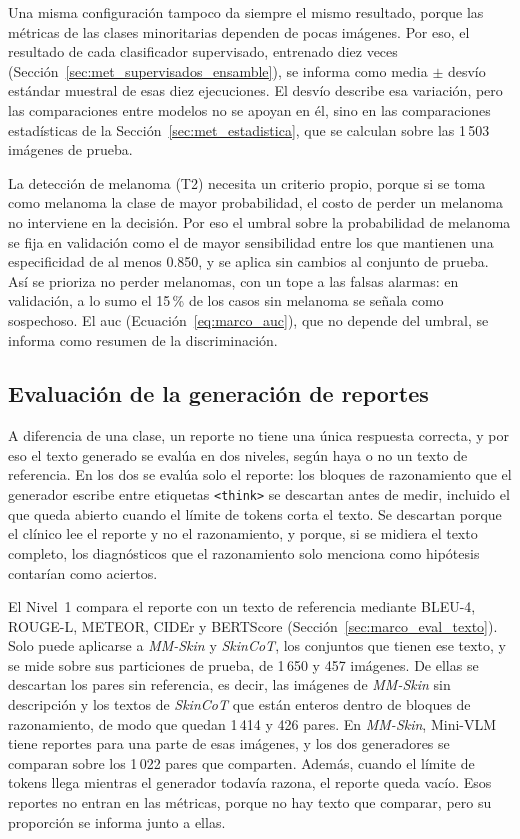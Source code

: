 Una misma configuración tampoco da siempre el mismo resultado, porque las métricas de las clases minoritarias dependen
de pocas imágenes. Por eso, el resultado de cada clasificador supervisado, entrenado diez veces
(Sección~\ref{sec:met_supervisados_ensamble}), se informa como media $\pm$ desvío estándar muestral de esas diez ejecuciones. El desvío describe esa variación, pero las comparaciones entre
modelos no se apoyan en él, sino en las comparaciones estadísticas de la Sección~\ref{sec:met_estadistica}, que se calculan
sobre las 1\,503 imágenes de prueba.

La detección de melanoma (T2) necesita un criterio propio, porque si se toma como melanoma la clase de mayor
probabilidad, el costo de perder un melanoma no interviene en la decisión. Por eso el umbral sobre la probabilidad de
melanoma se fija en validación como el de mayor sensibilidad entre los que mantienen una especificidad de al menos
0.850, y se aplica sin cambios al conjunto de prueba. Así se prioriza no perder melanomas, con un tope a las falsas alarmas: en
validación, a lo sumo el 15\,\% de los casos sin melanoma se señala como sospechoso. El \gls{auc}
(Ecuación~\ref{eq:marco_auc}), que no depende del umbral, se informa como resumen de la discriminación.

\subsection{Evaluación de la generación de reportes}
\label{sec:met_eval_generacion}

A diferencia de una clase, un reporte no tiene una única respuesta correcta, y por eso el texto generado se evalúa en
dos niveles, según haya o no un texto de referencia. En los dos se evalúa solo el reporte: los bloques de razonamiento
que el generador escribe entre etiquetas \texttt{\textless{}think\textgreater{}} se descartan antes de medir, incluido
el que queda abierto cuando el límite de tokens corta el texto. Se descartan porque el clínico lee el reporte y no el
razonamiento, y porque, si se midiera el texto completo, los diagnósticos que el razonamiento solo menciona como
hipótesis contarían como aciertos.

El Nivel~1 compara el reporte con un texto de referencia mediante BLEU-4, ROUGE-L, METEOR, CIDEr y BERTScore
(Sección~\ref{sec:marco_eval_texto}). Solo puede aplicarse a \emph{MM-Skin} y \emph{SkinCoT}, los conjuntos que tienen
ese texto, y se mide sobre sus particiones de prueba, de 1\,650 y 457 imágenes. De ellas se descartan los pares sin
referencia, es decir, las imágenes de \emph{MM-Skin} sin descripción y los textos de \emph{SkinCoT} que están enteros
dentro de bloques de razonamiento, de modo que quedan 1\,414 y 426 pares. En \emph{MM-Skin}, Mini-VLM tiene reportes
para una parte de esas imágenes, y los dos generadores se comparan sobre los 1\,022 pares que comparten. Además,
cuando el límite de tokens llega mientras el generador todavía razona, el reporte queda vacío. Esos reportes no entran
en las métricas, porque no hay texto que comparar, pero su proporción se informa junto a ellas.

